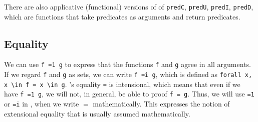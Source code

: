 There are also applicative (functional) versions of of \lstinline{predC}, \lstinline{predU}, \lstinline{predI}, \lstinline{predD}, 
which are functions that take predicates as arguments and return predicates.

\subsection{Equality}
We can use \lstinline{f =1 g} to express that the functions \lstinline{f} and \lstinline{g} agree in all arguments.
If we regard \lstinline{f} and \lstinline{g} as sets, we can write \lstinline{f =i g}, which is defined as \lstinline{forall x, x \in f = x \in g}.
\coq's equality \lstinline{=} is intensional, which means that even if we have \lstinline{f =1 g}, we will not, in general, be able to proof \lstinline{f = g}.
Thus, we will use \lstinline{=1} or \lstinline{=i} in \coq, when we write $=$ mathematically. 
This expresses the notion of extensional equality that is usually assumed mathematically.



